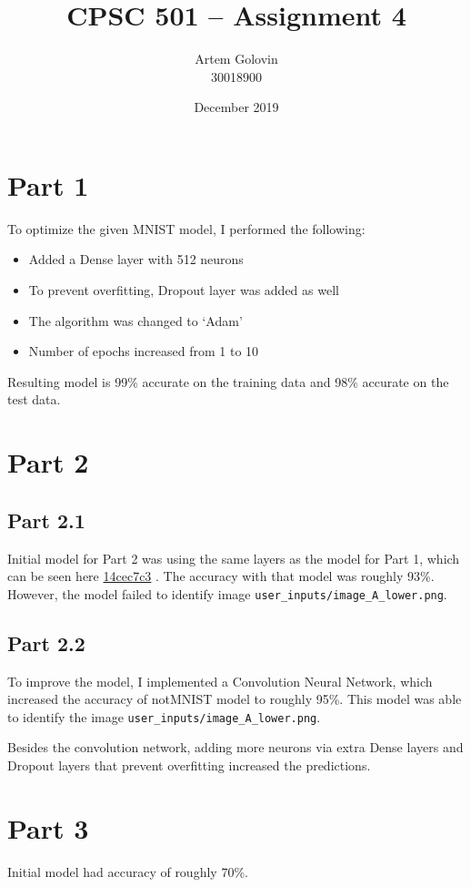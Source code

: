 \documentclass{article}
\title{CPSC 501 -- Assignment 4}
\author{Artem Golovin \\ 30018900}
\date{December 2019}
\newcommand{\gh}[1]{%
  \href{https://github.com/awave1/cpsc501-tensorflow/commit/#1}{#1}%
}
\begin{document}
\maketitle

\section*{Part 1}

To optimize the given MNIST model, I performed the following:

\begin{itemize}
  \item Added a Dense layer with 512 neurons
  \item To prevent overfitting, Dropout layer was added as well
  \item The algorithm was changed to `Adam'
  \item Number of epochs increased from 1 to 10
\end{itemize}

Resulting model is 99\% accurate on the training data and 98\% accurate on the test data.

\section*{Part 2}

\subsection*{Part 2.1}

Initial model for Part 2 was using the same layers as the model for Part 1, which can be seen here \gh{14cec7c3}. The accuracy with that model was roughly 93\%. However, the model failed to identify image \texttt{user\_inputs/image\_A\_lower.png}.

\subsection*{Part 2.2}

To improve the model, I implemented a Convolution Neural Network, which increased the accuracy of notMNIST model to roughly 95\%. This model was able to identify the image \texttt{user\_inputs/image\_A\_lower.png}.

Besides the convolution network, adding more neurons via extra Dense layers and Dropout layers that prevent overfitting increased the predictions.

\section*{Part 3}

Initial model had accuracy of roughly 70\%.
\end{document}
